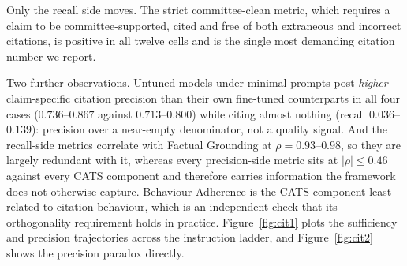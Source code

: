 Only the recall side moves. The strict committee-clean metric, which requires a
claim to be committee-supported, cited and free of both extraneous and
incorrect citations, is positive in all twelve cells and is the single most
demanding citation number we report.



\FloatBarrier

\begin{table}[htbp]
\caption{Citation-metric changes under trace supervision, fine-tuned minus
baseline, across the twelve end-to-end cells.}
\label{tab:citresults}
\end{table}

Two further observations. Untuned models under minimal prompts post
\emph{higher} claim-specific citation precision than their own fine-tuned
counterparts in all four cases ($0.736$--$0.867$ against $0.713$--$0.800$)
while citing almost nothing (recall $0.036$--$0.139$): precision over a
near-empty denominator, not a quality signal.
And the recall-side metrics correlate with Factual Grounding at
$\rho=0.93$--$0.98$, so they are largely redundant with it, whereas every
precision-side metric sits at $|\rho|\leq0.46$ against every CATS component and
therefore carries information the framework does not otherwise capture. Behaviour
Adherence is the CATS component least related to citation behaviour, which is an
independent check that its orthogonality requirement holds in practice.
Figure~\ref{fig:cit1} plots the sufficiency and precision trajectories across
the instruction ladder, and Figure~\ref{fig:cit2} shows the precision paradox
directly.





